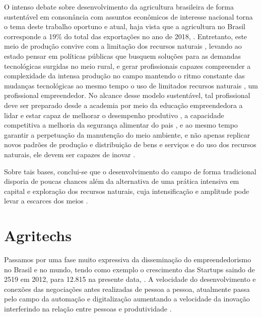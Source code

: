 O intenso debate sobre desenvolvimento da agricultura brasileira de forma sustentável em consonância com assuntos econômicos de interesse nacional torna o tema deste trabalho oportuno e atual, haja vista que a agricultura no Brasil corresponde a 19\% do total das exportações no ano de 2018, \cite{mdic_comex_2019}. Entretanto, este meio de produção convive com a limitação dos recursos naturais \cite{jacobi_meio_1999}, levando ao estado pensar em políticas públicas que busquem soluções para as demandas tecnológicas surgidas no meio rural, e gerar profissionais capazes compreender a complexidade da intensa produção no campo mantendo o ritmo constante das mudanças tecnológicas ao mesmo tempo o uso de limitados recursos naturais  \cite{costa_dinamica_2016}, um profissional empreendedor.
No alcance desse modelo sustentável, tal profissional deve ser preparado desde a academia por meio da educação empreendedora a lidar e estar capaz de melhorar o desempenho produtivo \cite{da_silva_qualidade_2017}, a capacidade competitiva a melhoria da segurança alimentar do pais \cite{hoffmann_brasil_2014}, e ao mesmo tempo garantir a perpetuação da manutenção do meio ambiente, e não apenas replicar novos padrões de produção e distribuição de bens e serviços e do uso dos recursos naturais, ele devem ser capazes de inovar \cite{morais_empreendedorismo_2018}.

Sobre tais bases, conclui-se que o desenvolvimento do campo de forma tradicional disporia de poucas chances além da alternativa de uma prática intensiva em capital e exploração dos recursos naturais, cuja intensificação e amplitude pode levar a escarces dos meios \cite{costa_agrarian_2016}. 


\section{Agritechs}


Passamos por uma fase muito expressiva da disseminação do empreendedorismo no Brasil e no mundo, tendo como exemplo o crescimento das Startups saindo de 2519 em 2012, para 12.815 na presente data, \cite{abstartups_startupbase_2019}. A velocidade do desenvolvimento e conexões das negociações antes realizadas de pessoa a pessoa, atualmente passa pelo campo da automação e digitalização aumentando a velocidade da inovação interferindo na relação entre pessoas e produtividade \cite{campos_o_2016}.


